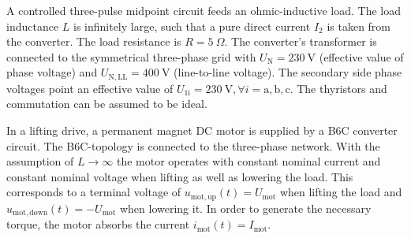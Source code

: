 

A controlled three-pulse midpoint circuit feeds an ohmic-inductive load. The load inductance $L$ is infinitely large, such that a pure direct current $I_\mathrm{2}$ is taken from the converter. The load resistance is $R = \SI{5}{\Omega}$. The converter's transformer 
is connected to the symmetrical three-phase grid with $U_\mathrm{N} = \SI{230}{\volt} $ (effective value of phase voltage) and  $U_\mathrm{N,LL} = \SI{400}{\volt} $ (line-to-line voltage). The secondary side phase voltages point an effective value of 
$U_\mathrm{1i} = \SI{230}{\volt}, \forall i=\mathrm{a,b,c}$. The thyristors and commutation can be assumed to be ideal.






In a lifting drive, a permanent magnet DC motor is supplied by a B6C converter circuit. The B6C-topology is connected to the three-phase network.
With the assumption of $L\rightarrow\infty$ the motor operates with constant nominal current and constant nominal voltage when lifting as well as lowering the load.
This corresponds to a terminal voltage of $u_\mathrm{mot,up}(t)=U_\mathrm{mot}$ when lifting the load and $u_\mathrm{mot,down}(t)=-U_\mathrm{mot}$ when lowering it.
In order to generate the necessary torque, the motor absorbs the current $i_\mathrm{mot}(t)=I_\mathrm{mot}$.

